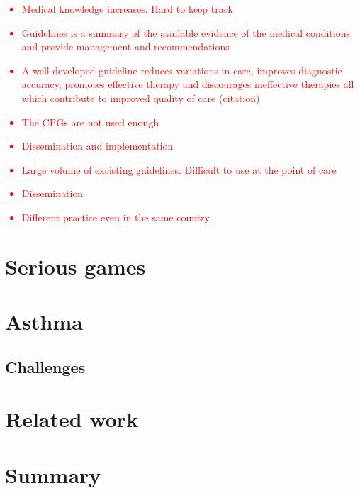 \textcolor{red}{\begin{itemize}
	\item Medical knowledge increases. Hard to keep track
	\item Guidelines is a summary of the available evidence of the medical conditions and provide management and recommendations
	\item A well-developed guideline reduces
	variations in care, improves diagnostic accuracy,
	promotes effective therapy and discourages ineffective
	therapies all which contribute to improved
	quality of care (citation)
	\item The CPGs are not used enough
	\item Dissemination and implementation
	\item Large volume of excisting guidelines. Difficult to use at the point of care
	\item Dissemination
	\item Different practice even in the same country
\end{itemize}}
\section{Serious games}
\section{Asthma}
\subsection{Challenges}
\section{Related work}
\section{Summary}